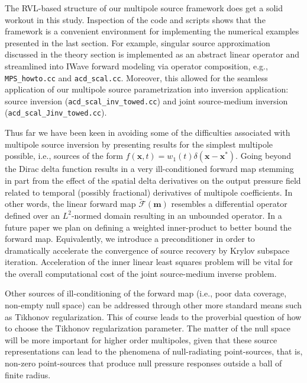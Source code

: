 The RVL-based structure of our multipole source framework does get a solid workout in this study. 
Inspection of the code and scripts shows that the framework is a convenient environment for implementing the numerical examples presented in the last section.
For example, singular source approximation discussed in the theory section is implemented as an abstract linear operator and streamlined into IWave forward modeling via operator composition, e.g., {\tt MPS\_howto.cc} and {\tt acd\_scal.cc}.
Moreover, this allowed for the seamless application of our multipole source parametrization into inversion application: source inversion ({\tt acd\_scal\_inv\_towed.cc}) and joint source-medium inversion ({\tt acd\_scal\_Jinv\_towed.cc}).

Thus far we have been keen in avoiding some of the difficulties associated with multipole source inversion by presenting results for the simplest multipole possible, i.e., sources of the form $f(\mathbf x,t) = w_1(t)\delta(\mathbf x-\mathbf x^*)$.
Going beyond the Dirac delta function results in a very ill-conditioned forward map stemming in part from the effect of the spatial delta derivatives on the output pressure field related to temporal (possibly fractional) derivatives of multipole coefficients.
In other words, the linear forward map $\tilde{\mathcal F}(\mathbf m)$ resembles a differential operator defined over an $L^2$-normed domain resulting in an unbounded operator.
In a future paper we plan on defining a weighted inner-product to better bound the forward map.
Equivalently, we introduce a preconditioner in order to dramatically accelerate the convergence of source recovery by Krylov subspace iteration.
Acceleration of the inner linear least squares problem will be vital for the overall computational cost of the joint source-medium inverse problem.

Other sources of ill-conditioning of the forward map (i.e., poor data coverage, non-empty null space) can be addressed through other more standard means such as Tikhonov regularization.
This of course leads to the proverbial question of how to choose the Tikhonov regularization parameter.
The matter of the null space will be more important for higher order multipoles, given that these source representations can lead to the phenomena of null-radiating point-sources, that is, non-zero point-sources that produce null pressure responses outside a ball of finite radius. 

